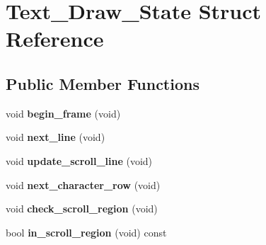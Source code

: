 \hypertarget{structText__Draw__State}{\section{Text\-\_\-\-Draw\-\_\-\-State Struct Reference}
\label{structText__Draw__State}
}
\subsection*{Public Member Functions}
\begin{DoxyCompactItemize}
\item 
\hypertarget{structText__Draw__State_a54adf8463fa677e8d6234b2800ef3af0}{void {\bfseries begin\-\_\-frame} (void)}\label{structText__Draw__State_a54adf8463fa677e8d6234b2800ef3af0}

\item 
\hypertarget{structText__Draw__State_aff8fb34fdb4fa86e12710e8adeae092b}{void {\bfseries next\-\_\-line} (void)}\label{structText__Draw__State_aff8fb34fdb4fa86e12710e8adeae092b}

\item 
\hypertarget{structText__Draw__State_afc956ba2b1ee8db01d58bd77f01332e9}{void {\bfseries update\-\_\-scroll\-\_\-line} (void)}\label{structText__Draw__State_afc956ba2b1ee8db01d58bd77f01332e9}

\item 
\hypertarget{structText__Draw__State_aca345fd5bd862a2cdec7dafa0f681fce}{void {\bfseries next\-\_\-character\-\_\-row} (void)}\label{structText__Draw__State_aca345fd5bd862a2cdec7dafa0f681fce}

\item 
\hypertarget{structText__Draw__State_aeabe66bebab873779e39a1e1ea4b99b9}{void {\bfseries check\-\_\-scroll\-\_\-region} (void)}\label{structText__Draw__State_aeabe66bebab873779e39a1e1ea4b99b9}

\item 
\hypertarget{structText__Draw__State_ab69ab6136d64ccc8af0b28a7e2b25aff}{bool {\bfseries in\-\_\-scroll\-\_\-region} (void) const }\label{structText__Draw__State_ab69ab6136d64ccc8af0b28a7e2b25aff}

\end{DoxyCompactItemize}
